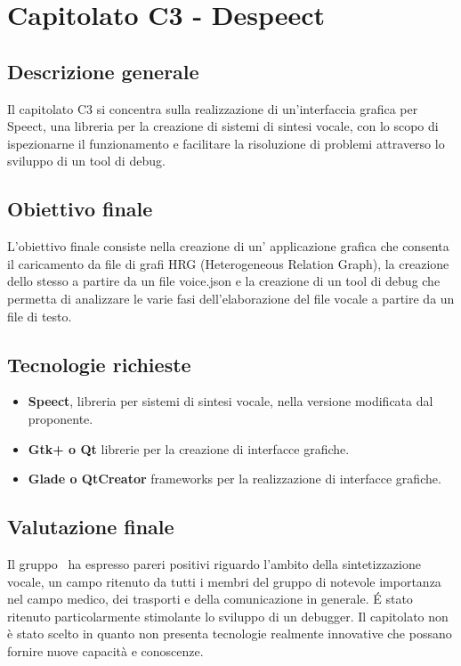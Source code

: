 \documentclass[StudioDiFattibilità.tex]{subfiles}
\begin{document}
\chapter{Capitolato C3 - Despeect}
\section{Descrizione generale}
Il capitolato C3 si concentra sulla realizzazione di un'interfaccia grafica per Speect, una libreria per la creazione di sistemi di sintesi vocale, con lo scopo di ispezionarne il funzionamento e facilitare la risoluzione di problemi attraverso lo sviluppo di un tool di debug. 
\section{Obiettivo finale}
L'obiettivo finale consiste nella creazione di un’ applicazione grafica che consenta il caricamento da file di grafi HRG (Heterogeneous Relation Graph), la creazione dello stesso a partire da un file voice.json e la creazione di un tool di debug che permetta di analizzare le varie fasi dell'elaborazione del file vocale a partire da un file di testo.
\section{Tecnologie richieste}
\begin{itemize}
	\item \textbf{Speect}, libreria per sistemi di sintesi vocale, nella versione modificata dal proponente.
	\item \textbf{Gtk+ o Qt} librerie per la creazione di interfacce grafiche.
	\item \textbf{Glade o QtCreator} frameworks per la realizzazione di interfacce grafiche.
\end{itemize}
\section{Valutazione finale}
Il gruppo \gruppo\ ha espresso pareri positivi riguardo l'ambito della sintetizzazione vocale, un campo ritenuto da tutti i membri del gruppo di notevole importanza nel campo medico, dei trasporti e della comunicazione in generale.
\'{E} stato ritenuto particolarmente stimolante lo sviluppo di un debugger.
Il capitolato non è stato scelto in quanto non presenta tecnologie realmente innovative che possano fornire nuove capacità e conoscenze.
\end{document}
